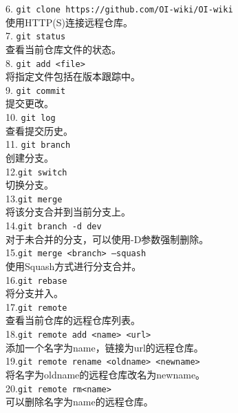 \documentclass[a4paper,12pt]{article}
\begin{document}
6. \texttt{git clone https://github.com/OI-wiki/OI-wiki} \\
  使用HTTP(S)连接远程仓库。\\

7. \texttt{git status} \\
  查看当前仓库文件的状态。\\

8. \texttt{git add <file>} \\
  将指定文件包括在版本跟踪中。\\

9. \texttt{git commit} \\
  提交更改。\\

10. \texttt{git log} \\
  查看提交历史。\\

11. \texttt{git branch} \\
  创建分支。\\

12.\texttt{git switch}\\
  切换分支。\\

13.\texttt{git merge}\\
  将该分支合并到当前分支上。\\

14.\texttt{git branch -d dev}\\
  对于未合并的分支，可以使用-D参数强制删除。\\

15.\texttt{git merge <branch> --squash}\\
  使用Squash方式进行分支合并。\\

16.\texttt{git rebase}\\
  将分支并入。\\

17.\texttt{git remote}\\
  查看当前仓库的远程仓库列表。\\

18.\texttt{git remote add <name> <url>}\\
  添加一个名字为name，链接为url的远程仓库。 \\

19.\texttt{git remote rename <oldname> <newname>}\\
  将名字为oldname的远程仓库改名为newname。\\

20.\texttt{git remote rm<name>}\\
  可以删除名字为name的远程仓库。\\
\end{document}
